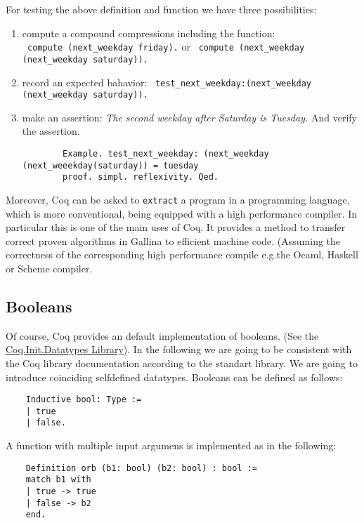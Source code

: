   For testing the above definition and function we have three possibilities:   
   \begin{enumerate}
   \item compute a compound compressions including the function:\\
   \lstinline! compute (next_weekday friday).! or 
   \lstinline! compute (next_weekday (next_weekday saturday)).!
   \item record an expected bahavior: \lstinline! test_next_weekday:(next_weekday (next_weekday saturday)).! 
   \item make an assertion: {\itshape The second weekday after Saturday is Tuesday.} And verify the assertion. 
   \begin{lstlisting}
   		Example. test_next_weekday: (next_weekday (next_weeekday(saturday)) = tuesday 
   		proof. simpl. reflexivity. Qed.
   \end{lstlisting}
   \end{enumerate}   

    Moreover, Coq can be asked to \lstinline!extract! a program in a programming language, which is more conventional, being equipped with a high performance compiler.
    In particular this is one of the main uses of Coq. 
    It provides a method to transfer correct proven algorithms in Gallina to efficient machine code.
    (Assuming the correctness of the corresponding high performance compile e.g.the Ocaml, Haskell or Scheme compiler. 
    
    \subsection{Booleans}
    Of course, Coq provides an default implementation of booleans. (See the \href{https://www.cs.princeton.edu/courses/archive/fall07/cos595/stdlib/html/Coq.Init.Datatypes.html}{Coq.Init.Datatypes Library}). %
    In the following we are going to be consistent with the Coq library documentation according to the standart library. We are going to introduce coinciding selfdefined datatypes.
    Booleans can be defined as follows:
    
    \label{Def:booleans}
    \begin{lstlisting}    
    Inductive bool: Type :=
    | true
    | false.
    \end{lstlisting}
    
    A function with multiple input argumens is implemented as in the following:
    \begin{lstlisting}
    Definition orb (b1: bool) (b2: bool) : bool :=
    match b1 with
    | true -> true
    | false -> b2
    end.
    \end{lstlisting}
     
